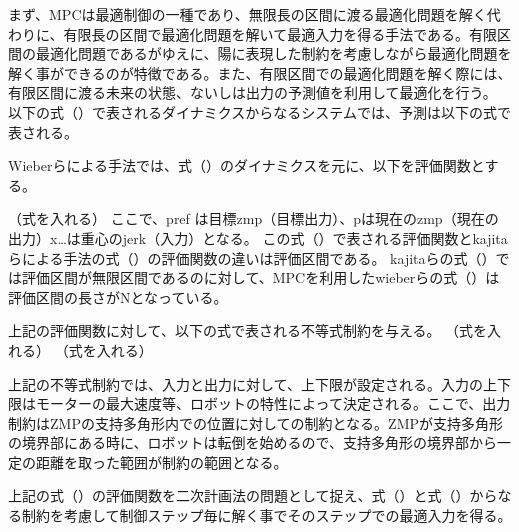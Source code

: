 まず、MPCは最適制御の一種であり、無限長の区間に渡る最適化問題を解く代わりに、有限長の区間で最適化問題を解いて最適入力を得る手法である。有限区間の最適化問題であるがゆえに、陽に表現した制約を考慮しながら最適化問題を解く事ができるのが特徴である。また、有限区間での最適化問題を解く際には、有限区間に渡る未来の状態、ないしは出力の予測値を利用して最適化を行う。
以下の式（）で表されるダイナミクスからなるシステムでは、予測は以下の式で表される。

Wieberらによる手法\cite{WIEBER}では、式（）のダイナミクスを元に、以下を評価関数とする。

（式を入れる）
ここで、pref は目標zmp（目標出力）、pは現在のzmp（現在の出力）x…は重心のjerk（入力）となる。
この式（）で表される評価関数とkajitaらによる手法の式（）の評価関数の違いは評価区間である。
kajitaらの式（）では評価区間が無限区間であるのに対して、MPCを利用したwieberらの式（）は評価区間の長さがNとなっている。

上記の評価関数に対して、以下の式で表される不等式制約を与える。
（式を入れる）
（式を入れる）

上記の不等式制約では、入力と出力に対して、上下限が設定される。入力の上下限はモーターの最大速度等、ロボットの特性によって決定される。ここで、出力制約はZMPの支持多角形内での位置に対しての制約となる。ZMPが支持多角形の境界部にある時に、ロボットは転倒を始めるので、支持多角形の境界部から一定の距離を取った範囲が制約の範囲となる。

上記の式（）の評価関数を二次計画法の問題として捉え、式（）と式（）からなる制約を考慮して制御ステップ毎に解く事でそのステップでの最適入力を得る。